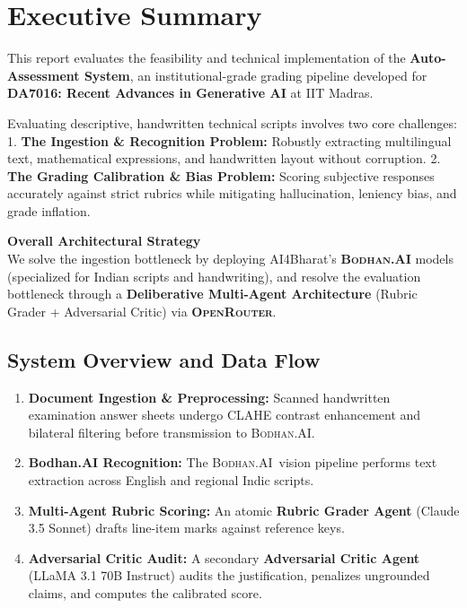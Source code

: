 \documentclass[11pt,a4paper]{article}
\newcommand{\BodhanAI}{\textsc{Bodhan.AI}}
\newcommand{\OpenRouter}{\textsc{OpenRouter}}
\begin{document}
\tableofcontents
\newpage
{}

\section{Executive Summary}
This report evaluates the feasibility and technical implementation of the \textbf{Auto-Assessment System}, an institutional-grade grading pipeline developed for \textbf{DA7016: Recent Advances in Generative AI} at IIT Madras.

Evaluating descriptive, handwritten technical scripts involves two core challenges:
1. \textbf{The Ingestion \& Recognition Problem:} Robustly extracting multilingual text, mathematical expressions, and handwritten layout without corruption.
2. \textbf{The Grading Calibration \& Bias Problem:} Scoring subjective responses accurately against strict rubrics while mitigating hallucination, leniency bias, and grade inflation.

\begin{keyfinding}
    \textbf{Overall Architectural Strategy} \\
    We solve the ingestion bottleneck by deploying AI4Bharat's \textbf{\BodhanAI} models (specialized for Indian scripts and handwriting), and resolve the evaluation bottleneck through a \textbf{Deliberative Multi-Agent Architecture} (Rubric Grader + Adversarial Critic) via \textbf{\OpenRouter}.
\end{keyfinding}

\subsection*{System Overview and Data Flow}
\begin{enumerate}
    \item \textbf{Document Ingestion \& Preprocessing:} Scanned handwritten examination answer sheets undergo CLAHE contrast enhancement and bilateral filtering before transmission to \BodhanAI.
    \item \textbf{Bodhan.AI Recognition:} The \BodhanAI\ vision pipeline performs text extraction across English and regional Indic scripts.
    \item \textbf{Multi-Agent Rubric Scoring:} An atomic \textbf{Rubric Grader Agent} (Claude 3.5 Sonnet) drafts line-item marks against reference keys.
    \item \textbf{Adversarial Critic Audit:} A secondary \textbf{Adversarial Critic Agent} (LLaMA 3.1 70B Instruct) audits the justification, penalizes ungrounded claims, and computes the calibrated score.
\end{enumerate}
\end{document}
